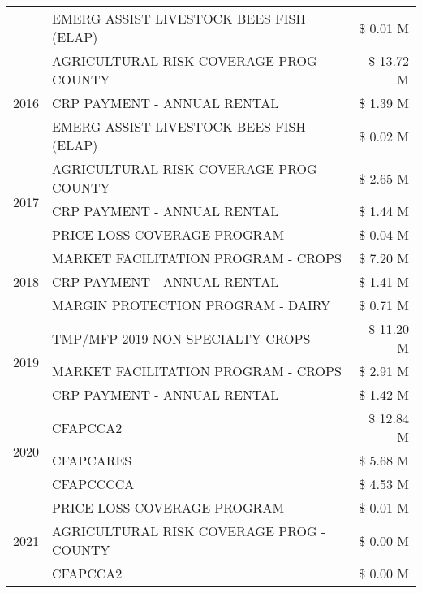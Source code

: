 \begin{tabular}{llr}
 & EMERG ASSIST LIVESTOCK BEES FISH (ELAP) & \$ 0.01 M \\
\cline{1-3}
\multirow[t]{3}{*}{2016} & AGRICULTURAL RISK COVERAGE PROG - COUNTY & \$ 13.72 M \\
 & CRP PAYMENT - ANNUAL RENTAL & \$ 1.39 M \\
 & EMERG ASSIST LIVESTOCK BEES FISH (ELAP) & \$ 0.02 M \\
\cline{1-3}
\multirow[t]{3}{*}{2017} & AGRICULTURAL RISK COVERAGE PROG - COUNTY & \$ 2.65 M \\
 & CRP PAYMENT - ANNUAL RENTAL & \$ 1.44 M \\
 & PRICE LOSS COVERAGE PROGRAM & \$ 0.04 M \\
\cline{1-3}
\multirow[t]{3}{*}{2018} & MARKET FACILITATION PROGRAM - CROPS & \$ 7.20 M \\
 & CRP PAYMENT - ANNUAL RENTAL & \$ 1.41 M \\
 & MARGIN PROTECTION PROGRAM - DAIRY & \$ 0.71 M \\
\cline{1-3}
\multirow[t]{3}{*}{2019} & TMP/MFP 2019 NON SPECIALTY CROPS & \$ 11.20 M \\
 & MARKET FACILITATION PROGRAM - CROPS & \$ 2.91 M \\
 & CRP PAYMENT - ANNUAL RENTAL & \$ 1.42 M \\
\cline{1-3}
\multirow[t]{3}{*}{2020} & CFAPCCA2 & \$ 12.84 M \\
 & CFAPCARES & \$ 5.68 M \\
 & CFAPCCCCA & \$ 4.53 M \\
\cline{1-3}
\multirow[t]{3}{*}{2021} & PRICE LOSS COVERAGE PROGRAM & \$ 0.01 M \\
 & AGRICULTURAL RISK COVERAGE PROG - COUNTY & \$ 0.00 M \\
 & CFAPCCA2 & \$ 0.00 M \\
\cline{1-3}
\bottomrule
\end{tabular}
